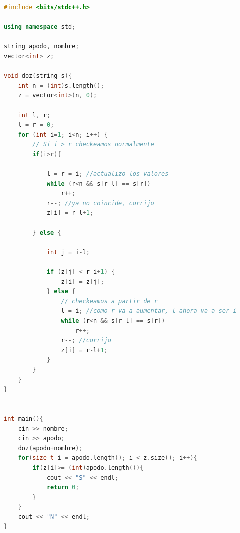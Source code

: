 \documentclass[a4paper]{article}
\begin{document}
\begin{lstlisting}[language=c++]
#include <bits/stdc++.h>

using namespace std;

string apodo, nombre;
vector<int> z;

void doz(string s){
    int n = (int)s.length();
    z = vector<int>(n, 0);
    
    int l, r;
    l = r = 0;
    for (int i=1; i<n; i++) {
        // Si i > r checkeamos normalmente
        if(i>r){
        
            l = r = i; //actualizo los valores
            while (r<n && s[r-l] == s[r])
                r++;
            r--; //ya no coincide, corrijo
            z[i] = r-l+1;
        
        } else {
        
            int j = i-l;

            if (z[j] < r-i+1) {
                z[i] = z[j];
            } else {
                // checkeamos a partir de r
                l = i; //como r va a aumentar, l ahora va a ser i
                while (r<n && s[r-l] == s[r])
                    r++;
                r--; //corrijo
                z[i] = r-l+1;
            }
        }
    }
}


int main(){
    cin >> nombre;
    cin >> apodo;
    doz(apodo+nombre);
    for(size_t i = apodo.length(); i < z.size(); i++){
        if(z[i]>= (int)apodo.length()){
            cout << "S" << endl;
            return 0;
        }
    }
    cout << "N" << endl;
}

\end{lstlisting}
\newpage
\end{document}
